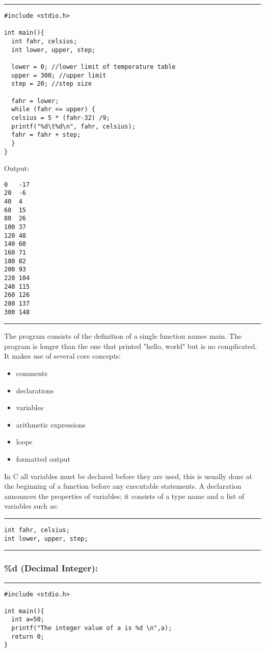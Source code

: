 \documentclass[a4paper]{article}
\begin{document}
\noindent\rule{\textwidth}{0.5pt}
\begin{verbatim}
#include <stdio.h>

int main(){
  int fahr, celsius;
  int lower, upper, step;

  lower = 0; //lower limit of temperature table
  upper = 300; //upper limit
  step = 20; //step size

  fahr = lower;
  while (fahr <= upper) {
  celsius = 5 * (fahr-32) /9;
  printf("%d\t%d\n", fahr, celsius);
  fahr = fahr + step;
  }
}
\end{verbatim}
Output:
\begin{verbatim}
0	-17
20	-6
40	4
60	15
80	26
100	37
120	48
140	60
160	71
180	82
200	93
220	104
240	115
260	126
280	137
300	148
\end{verbatim}

\noindent\rule{\textwidth}{0.5pt}
The program consists of the definition of a single function names main. The
program is longer than the one that printed "hello, world" but is no
complicated. It makes use of several core concepts:
\begin{itemize}
\item comments
\item declarations
\item variables
\item arithmetic expressions
\item loops
\item formatted output
\end{itemize}

In C all variables must be declared before they are used, this is usually done
at the beginning of a function before any executable statements. A declaration
announces the properties of variables; it consists of a type name and a list of
variables such as:

\noindent\rule{\textwidth}{0.5pt}
\begin{verbatim}
int fahr, celsius;
int lower, upper, step;
\end{verbatim}

\noindent\rule{\textwidth}{0.5pt}

\subsubsection{\%d (Decimal Integer):}
\label{sec:orgfdd6d0f}

\noindent\rule{\textwidth}{0.5pt}
\begin{verbatim}
#include <stdio.h>

int main(){
  int a=50;
  printf("The integer value of a is %d \n",a);
  return 0;
}
\end{verbatim}
\end{document}
